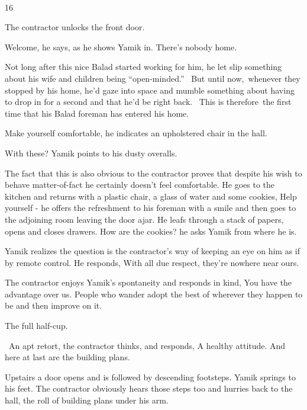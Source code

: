 \documentclass[letterpaper]{article}
\begin{document}
~

16 

The contractor unlocks the front door. 

{\textquotedbl}Welcome,{\textquotedbl} he says, as he shows Yamik in. {\textquotedbl}There's nobody home.{\textquotedbl}


Not long after this nice Balad started working for him, he let slip something about his wife and children being
``open-minded.'' \ But until now,~whenever they stopped by his home, he'd gaze into space and mumble something about
having to drop in for a second and that he'd be right back. ~This is therefore~the first time that his Balad foreman
has entered his home.

{\textquotedbl}Make yourself comfortable,{\textquotedbl} he indicates an upholstered chair in the hall.~ 

{\textquotedbl}With these?{\textquotedbl} Yamik points to his dusty overalls. 

The fact that this is also obvious to the contractor proves that despite his wish to behave matter-of-fact he certainly
doesn't feel comfortable. He goes to the kitchen and returns with a plastic chair, a glass of water and some cookies,
{\textquotedbl}Help yourself - {\textquotedbl} he offers the refreshment to his foreman with a smile and then goes to
the adjoining room leaving the door ajar. He leafs through a stack of papers, opens and closes drawers.
{\textquotedbl}How are the cookies?{\textquotedbl} he asks Yamik from where he is. 

Yamik realizes the question is the contractor's way of keeping an eye on him as if by remote control. He responds,
{\textquotedbl}With all due respect, they're nowhere near ours.{\textquotedbl} 

The contractor enjoys Yamik's spontaneity and responds in kind, {\textquotedbl}You have the advantage over us. People
who wander adopt the best of wherever they happen to be and then improve on it.{\textquotedbl} 

{\textquotedbl}The full half-cup.{\textquotedbl}

~An apt retort, the contractor thinks, and responds, {\textquotedbl}A healthy attitude. And here at last are the
building plans.{\textquotedbl}

Upstairs a door opens and is followed by descending footsteps. Yamik springs to his feet. The contractor obviously hears
those steps too and hurries back to the hall, the roll of building plans under his arm. 
\end{document}
